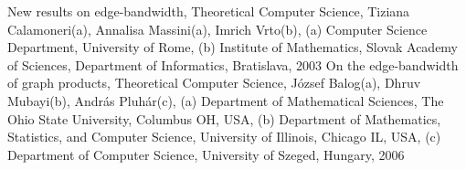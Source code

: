 \documentclass[oneside,onecolumn]{article}
\begin{document}
\newpage
\begin{thebibliography}{0} %
 New results on edge-bandwidth, Theoretical Computer Science, Tiziana Calamoneri(a), Annalisa Massini(a), Imrich Vrto(b), (a) Computer Science Department, University of Rome, (b) Institute of Mathematics, Slovak Academy of Sciences, Department of Informatics, Bratislava, 2003
 On the edge-bandwidth of graph products, Theoretical Computer Science, József Balog(a), Dhruv Mubayi(b), András Pluhár(c), (a) Department of Mathematical Sciences, The Ohio State University, Columbus OH, USA, (b) Department of Mathematics, Statistics, and Computer Science, University of Illinois, Chicago IL, USA, (c) Department of Computer Science, University of Szeged, Hungary, 2006
    
\end{thebibliography}

\end{document}
